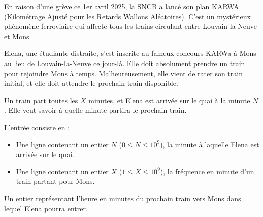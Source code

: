 \problemname{}


En raison d'une grève ce 1er avril 2025, la SNCB a lancé son plan KARWA (Kilométrage Ajusté pour les Retards Wallons Aléatoires). C'est un mystérieux phénomène ferroviaire qui affecte tous les trains circulant entre Louvain-la-Neuve et Mons.

Elena, une étudiante distraite, s'est inscrite au fameux concours KARWa à Mons au lieu de Louvain-la-Neuve ce jour-là. Elle doit absolument prendre un train pour rejoindre Mons à temps. Malheureusement, elle vient de rater son train initial, et elle doit attendre le prochain train disponible.

Un train part toutes les $X$ minutes, et Elena est arrivée sur le quai à la minute $N$. Elle veut savoir à quelle minute partira le prochain train.

\begin{Input}
    L'entrée consiste en :
    \begin{itemize}
        \item Une ligne contenant un entier $N$ ($0 \leq N \leq 10^{9}$), la minute à laquelle Elena est arrivée sur le quai.
        \item Une ligne contenant un entier $X$ ($1 \leq X \leq 10^{9}$), la fréquence en minute d'un train partant pour Mons.
    \end{itemize}
\end{Input}

\begin{Output}
    Un entier représentant l'heure en minutes du prochain train vers Mons dans lequel Elena pourra entrer.
\end{Output}

